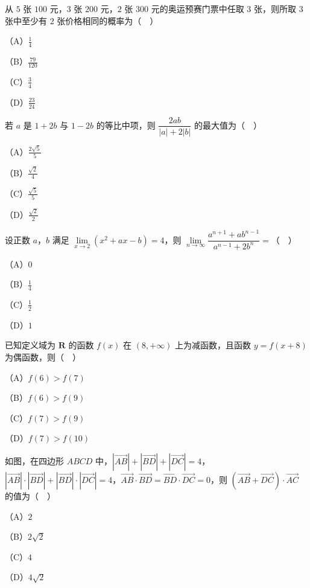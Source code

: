 \begin{question}
从 $5$ 张 $100$ 元，$3$ 张 $200$ 元，$2$ 张 $300$ 元的奥运预赛门票中任取 $3$ 张，则所取 $3$ 张中至少有 $2$ 张价格相同的概率为（　）

（A）$\frac14$

（B）$\frac{79}{120}$

（C）$\frac34$

（D）$\frac{23}{24}$

\end{question}
\begin{question}
若 $a$ 是 $1+2b$ 与 $1-2b$ 的等比中项，则 $\dfrac{2ab}{|a|+2|b|}$ 的最大值为（　）

（A）$\frac{2\sqrt5}{5}$

（B）$\frac{\sqrt2}{4}$

（C）$\frac{\sqrt5}{5}$

（D）$\frac{\sqrt2}{2}$

\end{question}
\begin{question}
设正数 $a$，$b$ 满足 $\lim\limits_{x\to2}(x^2+ax-b)=4$，则 $\lim\limits_{n\to\infty}\dfrac{a^{n+1}+ab^{n-1}}{a^{n-1}+2b^n}=$（　）

（A）$0$

（B）$\frac14$

（C）$\frac12$

（D）$1$

\end{question}
\begingroup
\renewenvironment{question}{\Needspace{0.48\textheight}}{}
\begin{question}
已知定义域为 $\mathbf R$ 的函数 $f(x)$ 在 $(8,+\infty)$ 上为减函数，且函数 $y=f(x+8)$ 为偶函数，则（　）

（A）$f(6)>f(7)$

（B）$f(6)>f(9)$

（C）$f(7)>f(9)$

（D）$f(7)>f(10)$

\Needspace{0.4\textheight}
\end{question}
\endgroup
\begin{question}
如图，在四边形 $ABCD$ 中，$\left|\overrightarrow{AB}\right|+\left|\overrightarrow{BD}\right|+\left|\overrightarrow{DC}\right|=4$，$\left|\overrightarrow{AB}\right|\cdot\left|\overrightarrow{BD}\right|+\left|\overrightarrow{BD}\right|\cdot\left|\overrightarrow{DC}\right|=4$，$\overrightarrow{AB}\cdot\overrightarrow{BD}=\overrightarrow{BD}\cdot\overrightarrow{DC}=0$，则 $\left(\overrightarrow{AB}+\overrightarrow{DC}\right)\cdot\overrightarrow{AC}$ 的值为（　）
\nopagebreak[4]
\begin{center}\end{center}
\nopagebreak[4]
（A）$2$

（B）$2\sqrt2$

（C）$4$

（D）$4\sqrt2$

\end{question}

